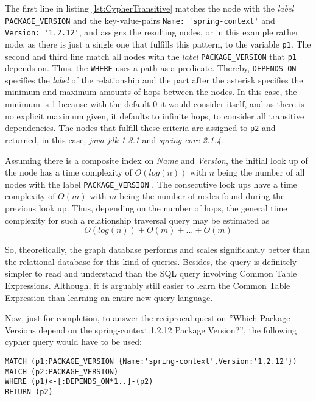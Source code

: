 The first line in listing \ref{lst:CypherTransitive} matches the node with the \emph{label} \lstinline|PACKAGE_VERSION| and the key-value-pairs \lstinline|Name: 'spring-context'| and \lstinline|Version: '1.2.12'|, and assigns the resulting nodes, or in this example rather node, as there is just a single one that fulfills this pattern, to the variable \lstinline|p1|. The second and third line match all nodes with the \emph{label} \lstinline|PACKAGE_VERSION| that \lstinline|p1| depends on. Thus, the \lstinline|WHERE| uses a path as a predicate. Thereby, \lstinline|DEPENDS_ON| specifies the \emph{label} of the relationship and the part after the asterisk specifies the minimum and maximum amounts of hops between the nodes. In this case, the minimum is 1 because with the default 0 it would consider itself, and as there is no explicit maximum given, it defaults to infinite hops, to consider all transitive dependencies. The nodes that fulfill these criteria are assigned to \lstinline|p2| and returned, in this case, \emph{java-jdk 1.3.1} and \emph{spring-core 2.1.4}.\par 
Assuming there is a composite index on \emph{Name} and \emph{Version}, the initial look up of the node has a time complexity of $O(log(n))$ with $n$ being the number of all nodes with the label \lstinline|PACKAGE_VERSION| \cite{neo4j}. The consecutive look ups have a time complexity of $O(m)$ with $m$ being the number of nodes found during the previous look up. Thus, depending on the number of hops, the general time complexity for such a relationship traversal query may be estimated as 
$$O(log(n)) + O(m) + ... + O(m)$$

So, theoretically, the graph database performs and scales significantly better than the relational database for this kind of queries. Besides, the query is definitely simpler to read and understand than the SQL query involving Common Table Expressions. Although, it is arguably still easier to learn the Common Table Expression than learning an entire new query language.\par 
Now, just for completion, to answer the reciprocal question ''Which Package Versions depend on the spring-context:1.2.12 Package Version?'', the following cypher query would have to be used:\\

\begin{lstlisting}[caption=Cypher Query -- Package Version Reciprocal Dependencies (transitive), captionpos=b, label=lst:CypherReciprocalTransitive]
MATCH (p1:PACKAGE_VERSION {Name:'spring-context',Version:'1.2.12'})
MATCH (p2:PACKAGE_VERSION)
WHERE (p1)<-[:DEPENDS_ON*1..]-(p2)
RETURN (p2)
\end{lstlisting}

